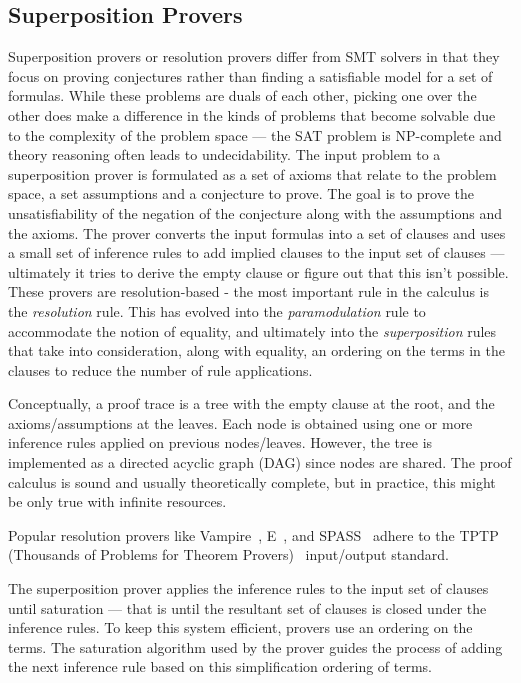 \documentclass{article}
\begin{document}
	\subsection{Superposition Provers}
	\label{sup}
	Superposition provers or resolution provers differ 
	from SMT solvers in that they focus on proving 
	conjectures rather than finding a satisfiable model
	for a set of formulas. While these problems are 
	duals of each other, picking one over the other 
	does make a difference in the kinds of problems 
	that become solvable due to the complexity of 
	the problem space --- the SAT problem is NP-complete
	and theory reasoning often leads to undecidability.
	The input problem to a superposition prover is 
	formulated as a set of axioms that relate to the 
	problem space, a set assumptions and a conjecture 
	to prove. The goal is to prove the unsatisfiability 
	of the negation of the conjecture along with the 
	assumptions and the axioms. The prover converts 
	the input formulas into a set of clauses and 
	uses a small set of inference rules to add 
	implied clauses to the input set of 
	clauses --- ultimately it tries to derive 
	the empty clause or figure out that this 
	isn't possible. These provers are resolution-based -
	the most important rule in the calculus is the 
	\textit{resolution} rule. This has evolved into 
	the \textit{paramodulation} rule to accommodate 
	the notion of equality, and ultimately into 
	the \textit{superposition} rules that take into 
	consideration, along with equality, an ordering 
	on the terms in the clauses to reduce the number 
	of rule applications.
	
	Conceptually, a proof trace is a tree with the empty 
	clause at the root, and the axioms/assumptions at 
	the leaves. Each node is obtained using one or more 
	inference rules applied on previous nodes/leaves. 
	However, the tree is implemented as a directed 
	acyclic graph (DAG) since nodes are shared. The 
	proof calculus is sound and usually theoretically 
	complete, but in practice, this might be only true 
	with infinite resources.
	
	Popular resolution provers like 
	Vampire~\cite{10.1007/978-3-642-39799-8_1}, 
	E~\cite{10.5555/1218615.1218621}, and 
	SPASS~\cite{10.1007/978-3-642-02959-2_10} adhere 
	to the TPTP (Thousands of Problems 
	for Theorem 
	Provers)~\cite{Sut17} input/output standard.
	
	The superposition prover applies the inference 
	rules to the input set of 
	clauses until saturation --- that is until the 
	resultant set of clauses is closed under the 
	inference rules. To keep this system
	efficient, provers use an ordering 
	on the terms. The saturation algorithm used 
	by the prover guides the process of adding the 
	next inference rule based on this simplification 
	ordering of terms.
	
\end{document}
